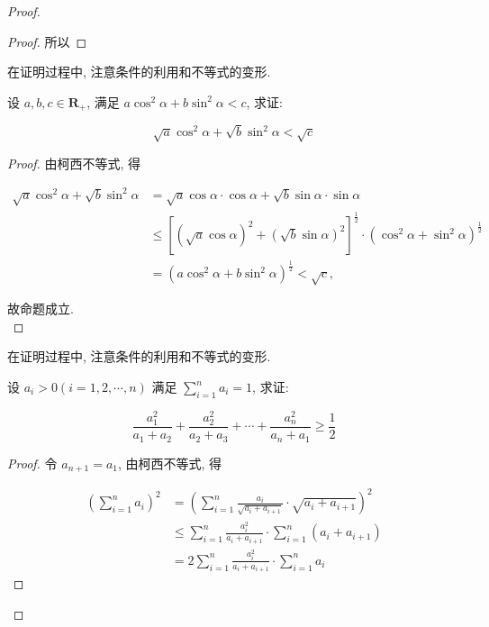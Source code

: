\begin{proof}
\begin{proof}
	所以
\end{proof}
\begin{note}
	在证明过程中, 注意条件的利用和不等式的变形.
\end{note}

\begin{example}
	设 $a, b, c \in \mathbf{R}_{+}$, 满足 $a \cos ^{2} \alpha+b \sin ^{2} \alpha<c$, 求证:
	
	$$
	\sqrt{a} \cos ^{2} \alpha+\sqrt{b} \sin ^{2} \alpha<\sqrt{c}
	$$
\end{example}
\begin{proof}
	由柯西不等式, 得
	
	$$
	\begin{aligned}
	\sqrt{a} \cos ^{2} \alpha+\sqrt{b} \sin ^{2} \alpha & =\sqrt{a} \cos \alpha \cdot \cos \alpha+\sqrt{b} \sin \alpha \cdot \sin \alpha \\
	& \leqslant\left[(\sqrt{a} \cos \alpha)^{2}+(\sqrt{b} \sin \alpha)^{2}\right]^{\frac{1}{2}} \cdot\left(\cos ^{2} \alpha+\sin ^{2} \alpha\right)^{\frac{1}{2}} \\
	& =\left(a \cos ^{2} \alpha+b \sin ^{2} \alpha\right)^{\frac{1}{2}}<\sqrt{c},
	\end{aligned}
	$$
	
	故命题成立.\\
\end{proof}
\begin{note}
	在证明过程中, 注意条件的利用和不等式的变形.
\end{note}

\begin{example}
	设 $a_{i}>0(i=1,2, \cdots, n)$ 满足 $\sum_{i=1}^{n} a_{i}=1$, 求证:
	
	$$
	\frac{a_{1}^{2}}{a_{1}+a_{2}}+\frac{a_{2}^{2}}{a_{2}+a_{3}}+\cdots+\frac{a_{n}^{2}}{a_{n}+a_{1}} \geqslant \frac{1}{2}
	$$
\end{example}
\begin{proof}
	令 $a_{n+1}=a_{1}$, 由柯西不等式, 得
	
	$$
	\begin{aligned}
	\left(\sum_{i=1}^{n} a_{i}\right)^{2} & =\left(\sum_{i=1}^{n} \frac{a_{i}}{\sqrt{a_{i}+a_{i+1}}} \cdot \sqrt{a_{i}+a_{i+1}}\right)^{2} \\
	& \leqslant \sum_{i=1}^{n} \frac{a_{i}^{2}}{a_{i}+a_{i+1}} \cdot \sum_{i=1}^{n}\left(a_{i}+a_{i+1}\right) \\
	& =2 \sum_{i=1}^{n} \frac{a_{i}^{2}}{a_{i}+a_{i+1}} \cdot \sum_{i=1}^{n} a_{i}
	\end{aligned}
	$$
	

\end{proof}
\end{proof}
